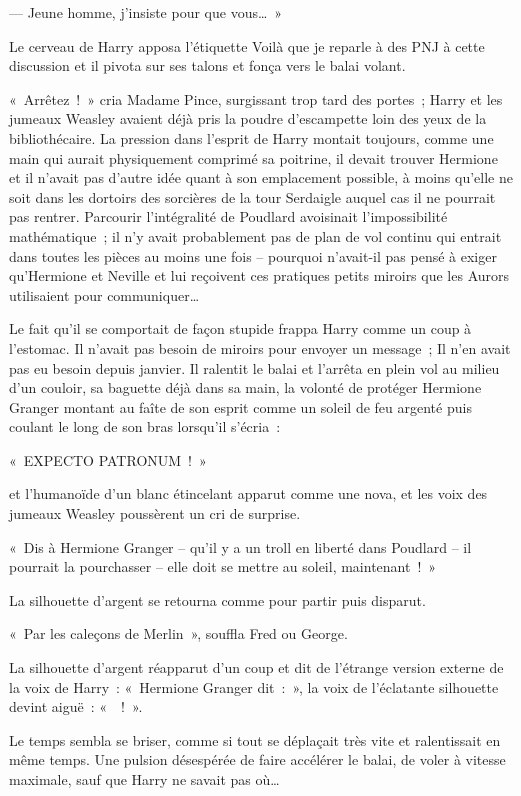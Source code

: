 --- Jeune homme, j'insiste pour que vous…~»

Le cerveau de Harry apposa l'étiquette Voilà que je reparle à des PNJ à cette discussion et il pivota sur ses talons et fonça vers le balai volant.

«~Arrêtez~!~» cria Madame Pince, surgissant trop tard des portes~; Harry et les jumeaux Weasley avaient déjà pris la poudre d'escampette loin des yeux de la bibliothécaire. La pression dans l'esprit de Harry montait toujours, comme une main qui aurait physiquement comprimé sa poitrine, il devait trouver Hermione et il n'avait pas d'autre idée quant à son emplacement possible, à moins qu'elle ne soit dans les dortoirs des sorcières de la tour Serdaigle auquel cas il ne pourrait pas rentrer. Parcourir l'intégralité de Poudlard avoisinait l'impossibilité mathématique~; il n'y avait probablement pas de plan de vol continu qui entrait dans toutes les pièces au moins une fois -- pourquoi n'avait-il pas pensé à exiger qu'Hermione et Neville et lui reçoivent ces pratiques petits miroirs que les Aurors utilisaient pour communiquer…

Le fait qu'il se comportait de façon stupide frappa Harry comme un coup à l'estomac. Il n'avait pas besoin de miroirs pour envoyer un message~; Il n'en avait pas eu besoin depuis janvier. Il ralentit le balai et l'arrêta en plein vol au milieu d'un couloir, sa baguette déjà dans sa main, la volonté de protéger Hermione Granger montant au faîte de son esprit comme un soleil de feu argenté puis coulant le long de son bras lorsqu'il s'écria~:

«~EXPECTO PATRONUM~!~»

et l'humanoïde d'un blanc étincelant apparut comme une nova, et les voix des jumeaux Weasley poussèrent un cri de surprise.

«~Dis à Hermione Granger -- qu'il y a un troll en liberté dans Poudlard -- il pourrait la pourchasser -- elle doit se mettre au soleil, maintenant~!~»

La silhouette d'argent se retourna comme pour partir puis disparut.

«~Par les caleçons de Merlin~», souffla Fred ou George.

La silhouette d'argent réapparut d'un coup et dit de l'étrange version externe de la voix de Harry~: «~Hermione Granger dit~:~», la voix de l'éclatante silhouette devint aiguë~: «~~!~».

Le temps sembla se briser, comme si tout se déplaçait très vite et ralentissait en même temps. Une pulsion désespérée de faire accélérer le balai, de voler à vitesse maximale, sauf que Harry ne savait pas où…

